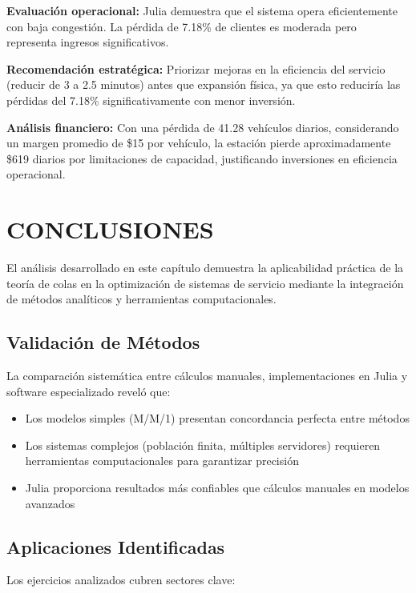\documentclass[12pt, a4paper, oneside]{book}
\theoremstyle{definition}
\begin{document}
\begin{center}
\begin{center}
\begin{center}
\textbf{Evaluación operacional:} Julia demuestra que el sistema opera eficientemente con baja congestión. La pérdida de 7.18\% de clientes es moderada pero representa ingresos significativos.

\textbf{Recomendación estratégica:} Priorizar mejoras en la eficiencia del servicio (reducir de 3 a 2.5 minutos) antes que expansión física, ya que esto reduciría las pérdidas del 7.18\% significativamente con menor inversión.

\textbf{Análisis financiero:} Con una pérdida de 41.28 vehículos diarios, considerando un margen promedio de \$15 por vehículo, la estación pierde aproximadamente \$619 diarios por limitaciones de capacidad, justificando inversiones en eficiencia operacional.

\section{CONCLUSIONES}

El análisis desarrollado en este capítulo demuestra la aplicabilidad práctica de la teoría de colas en la optimización de sistemas de servicio mediante la integración de métodos analíticos y herramientas computacionales.

\subsection{Validación de Métodos}

La comparación sistemática entre cálculos manuales, implementaciones en Julia y software especializado reveló que:

\begin{itemize}
\item Los modelos simples (M/M/1) presentan concordancia perfecta entre métodos
\item Los sistemas complejos (población finita, múltiples servidores) requieren herramientas computacionales para garantizar precisión
\item Julia proporciona resultados más confiables que cálculos manuales en modelos avanzados
\end{itemize}

\subsection{Aplicaciones Identificadas}

Los ejercicios analizados cubren sectores clave:


\end{center}
\end{center}
\end{center}
\end{document}
